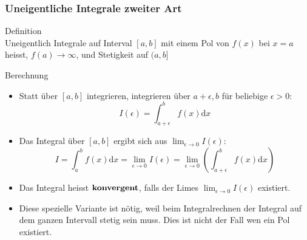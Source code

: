 \subsubsection{Uneigentliche Integrale zweiter Art}
	\begin{definition}{Definition}\\
		Uneigentlich Integrale auf Interval \([a,b]\) mit einem Pol von \(f(x)\) bei \(x=a\) heisst,
		\(f(a) \rightarrow \infty\), und Stetigkeit auf \((a,b]\)
  \end{definition}
  \begin{KR}{Berechnung}
	  \begin{itemize}
	  	
\item Statt über \([a,b]\) integrieren, integrieren über \(a+\epsilon,b\) für beliebige \(\epsilon>0\):
	\[I(\epsilon)=\int_{a+\epsilon}^b{f(x)\mathrm{d}x}\]
\item Das Integral über \([a,b]\) ergibt sich aus \(\lim_{\epsilon \rightarrow 0}I(\epsilon)\):
	\[I=\int_a^b{f(x)\mathrm{d}x}=\underset{\epsilon \rightarrow 0}{\lim}I(\epsilon)=\underset{\epsilon \rightarrow
	0}{\lim}(\int_{a+\epsilon}^b{f(x)\mathrm{d}x}) \]
\item Das Integral heisst \(\bold{konvergent}\), falls der Limes \(\lim_{\epsilon \rightarrow 0}I(\epsilon)\) existiert.
\item Diese spezielle Variante ist nötig, weil beim Integralrechnen der Integral auf dem ganzen Intervall stetig sein
	muss. Dies ist nicht der Fall wen ein Pol existiert.
\end{itemize}
  \end{KR}


